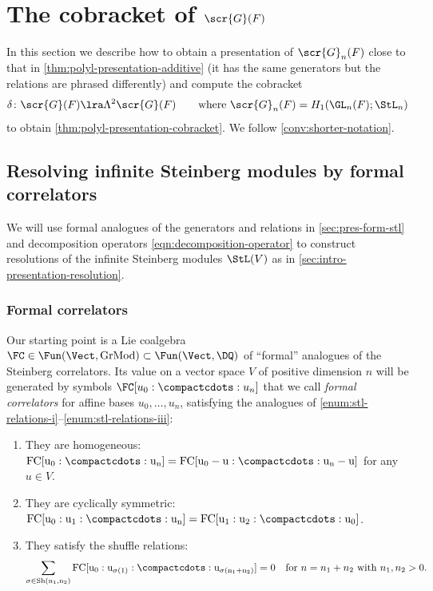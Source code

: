 \documentclass[a4paper]{amsart}
\begin{document}
\section{The cobracket of $\scr{G}(F)$} \label{sec:cobracket} In this section we describe how to obtain a presentation of $\scr{G}_n(F)$ close to that in \cref{thm:polyl-presentation-additive} (it has the same generators but the relations are phrased differently) and compute the cobracket
\[\delta \colon \scr{G}(F) \lra \Lambda^2 \scr{G}(F) \qquad \text{where $\scr{G}_n(F) = H_1(\GL_n(F);\StL_n)$}\]
to obtain \cref{thm:polyl-presentation-cobracket}. We follow \cref{conv:shorter-notation}.

\subsection{Resolving infinite Steinberg modules by formal correlators} We will use formal analogues of the generators and relations in \cref{sec:pres-form-stl} and decomposition operators \eqref{eqn:decomposition-operator} to construct resolutions of the infinite Steinberg modules $\StL(V)$ as in \cref{sec:intro-presentation-resolution}.

\subsubsection{Formal correlators} Our starting point is a Lie coalgebra $\FC \in \Fun(\Vect,\rm{GrMod}) \subset \Fun(\Vect,\DQ)$ of ``formal'' analogues of the Steinberg correlators. Its value on a vector space $V$ of positive dimension $n$ will be generated by symbols $\FC[u_0:\compactcdots:u_n]$ that we call \emph{formal correlators} for affine bases $u_0,\ldots,u_n$, satisfying the analogues of \eqref{enum:stl-relations-i}--\eqref{enum:stl-relations-iii}:
\begin{enumerate}[(1)]
\item \label{enum:fc-relations-i} They are homogeneous: $\rm{FC}[u_0:\compactcdots:u_n] = \rm{FC}[u_0-u:\compactcdots:u_n-u]$ for any $u \in V$.
\item \label{enum:fc-relations-ii} They are cyclically symmetric: $\rm{FC}[u_0:u_1:\compactcdots:u_n] = \rm{FC}[u_1:u_2:\compactcdots:u_0]$.
\item \label{enum:fc-relations-iii} They satisfy the shuffle relations: 
\[\sum_{\sigma \in \rm{Sh}(n_1,n_2)} \rm{FC}[u_0:u_{\sigma(1)}:\compactcdots:u_{\sigma(n_1+n_2)}] =0 \quad \text{for $n=n_1+n_2$ with $n_1,n_2>0$.}\]
\end{enumerate}
\end{document}

